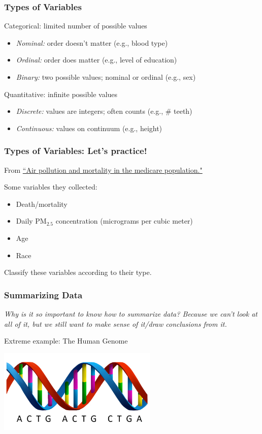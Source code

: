 \documentclass[12pt, 
hyperref={colorlinks=true, linkcolor=blue, urlcolor=cyan}]{beamer}
\begin{document}
\begin{frame}
\frametitle{Types of Variables}

\color{blue} Categorical: \color{black} limited number of possible values
\begin{itemize}
\item \textit{Nominal:} order doesn't matter (e.g., blood type)
\item \textit{Ordinal:} order does matter (e.g., level of education)
\item \textit{Binary:} two possible values; nominal or ordinal (e.g., sex)
\end{itemize}

\color{blue} Quantitative: \color{black} infinite possible values
\begin{itemize}
\item \textit{Discrete:} values are integers; often counts (e.g., \#  teeth)
\item \textit{Continuous:} values on continuum (e.g., height)
\end{itemize}

\end{frame}

\begin{frame} %
\frametitle{Types of Variables: Let's practice!}

From \href{http://www.nejm.org/doi/10.1056/NEJMoa1702747}{``Air pollution and mortality in the medicare population."}

Some variables they collected:
\begin{itemize}
\item Death/mortality
\item Daily PM$_{2.5}$ concentration (micrograms per cubic meter)
\item Age
\item Race 
\end{itemize}

\color{blue} Classify these variables according to their type. \color{black}

\end{frame}

\begin{frame} %
\frametitle{Summarizing Data}

\textit{Why is it so important to know how to summarize data? Because we can't look at all of it, but we still want to make sense of it/draw conclusions from it.}

\color{blue} Extreme example: \color{black} The Human Genome

\center \includegraphics[height=4cm]{./dna}

\end{frame}
\end{document}
